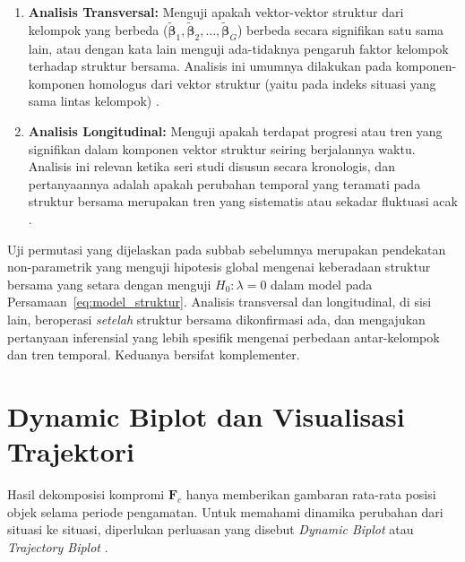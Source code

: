 \begin{enumerate}
  \item \textbf{Analisis Transversal:} Menguji apakah vektor-vektor struktur dari kelompok yang berbeda ($\tilde{\boldsymbol{\beta}}_1, \tilde{\boldsymbol{\beta}}_2, \ldots, \tilde{\boldsymbol{\beta}}_G$) berbeda secara signifikan satu sama lain, atau dengan kata lain menguji ada-tidaknya pengaruh faktor kelompok terhadap struktur bersama. Analisis ini umumnya dilakukan pada komponen-komponen homologus dari vektor struktur (yaitu pada indeks situasi yang sama lintas kelompok) \citep{oliveira2024}.

  \item \textbf{Analisis Longitudinal:} Menguji apakah terdapat progresi atau tren yang signifikan dalam komponen vektor struktur seiring berjalannya waktu. Analisis ini relevan ketika seri studi disusun secara kronologis, dan pertanyaannya adalah apakah perubahan temporal yang teramati pada struktur bersama merupakan tren yang sistematis atau sekadar fluktuasi acak \citep{areia2008,oliveira2024}.
\end{enumerate}

\begin{remark}
  Uji permutasi yang dijelaskan pada subbab sebelumnya merupakan pendekatan non-parametrik yang menguji hipotesis global mengenai keberadaan struktur bersama yang setara dengan menguji $H_0: \lambda = 0$ dalam model pada Persamaan~\eqref{eq:model_struktur}. Analisis transversal dan longitudinal, di sisi lain, beroperasi \textit{setelah} struktur bersama dikonfirmasi ada, dan mengajukan pertanyaan inferensial yang lebih spesifik mengenai perbedaan antar-kelompok dan tren temporal. Keduanya bersifat komplementer.
\end{remark}

\section{\normalsize Dynamic Biplot dan Visualisasi Trajektori}

Hasil dekomposisi kompromi $\mathbf{F}_c$ hanya memberikan gambaran rata-rata posisi objek selama periode pengamatan. Untuk memahami dinamika perubahan dari situasi ke situasi, diperlukan perluasan yang disebut \textit{Dynamic Biplot} atau \textit{Trajectory Biplot} \citep{egido2015}.

